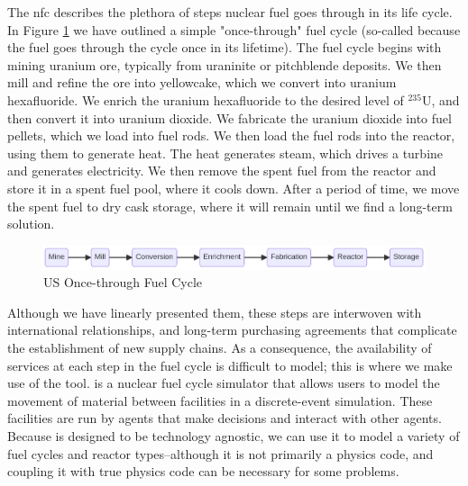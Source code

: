 The \gls{nfc} describes the plethora of steps nuclear fuel goes through
in its life cycle. In Figure \ref{fig:once-through} we have outlined a
simple "once-through" fuel cycle (so-called because the fuel goes through
the cycle once in its lifetime). The fuel cycle begins with mining uranium ore, typically from uraninite or pitchblende deposits. We then mill and refine the ore into yellowcake, which we convert into uranium hexafluoride. We enrich the uranium hexafluoride to the desired level of $^{235}$U, and then convert it into uranium dioxide. We fabricate the uranium dioxide into fuel pellets, which we load into fuel rods. We then load the fuel rods into the reactor, using them to generate heat. The heat generates steam, which drives a turbine and generates electricity. We then remove the spent fuel from the reactor and store it in a spent fuel pool, where it cools down. After a period of time, we move the spent fuel to dry cask storage, where it will remain until we find a long-term solution.

\begin{figure}[h]
    \centering
    \includegraphics[scale=0.40]{images/once_through_fc.png}
    \caption{US Once-through Fuel Cycle}
    \label{fig:once-through}
\end{figure}

Although we have linearly presented them, these steps are interwoven with international relationships, and long-term purchasing agreements that complicate the establishment of new supply chains. As a consequence, the availability of services at each step in the fuel cycle is difficult to model; this is where we make use of the \cyclus \cite{huff_cyclus_intro_2016} tool. \cyclus is a nuclear fuel cycle simulator that allows users to model the movement of material between facilities in a discrete-event simulation. These facilities are run by agents that make decisions and interact with other agents. Because \cyclus is designed to be technology agnostic, we can use it to model a variety of fuel cycles and reactor types--although it is not primarily a physics code, and coupling it with true physics code can be necessary for some problems.

